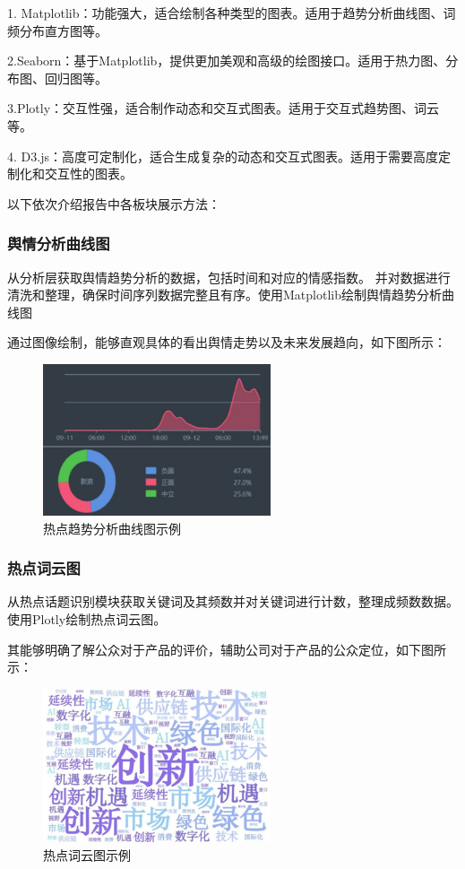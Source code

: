 \documentclass[UTF8,a4paper,15pt,titlepage,oneside]{ctexbook}
\begin{document}
1. Matplotlib：功能强大，适合绘制各种类型的图表。适用于趋势分析曲线图、词频分布直方图等。

2.Seaborn：基于Matplotlib，提供更加美观和高级的绘图接口。适用于热力图、分布图、回归图等。

3.Plotly：交互性强，适合制作动态和交互式图表。适用于交互式趋势图、词云等。

4. D3.js：高度可定制化，适合生成复杂的动态和交互式图表。适用于需要高度定制化和交互性的图表。


以下依次介绍报告中各板块展示方法：


\subsubsection{舆情分析曲线图}

从分析层获取舆情趋势分析的数据，包括时间和对应的情感指数。
并对数据进行清洗和整理，确保时间序列数据完整且有序。使用Matplotlib绘制舆情趋势分析曲线图

通过图像绘制，能够直观具体的看出舆情走势以及未来发展趋向，如下图所示：

\begin{figure}[H]
  \centering
  \includegraphics[width=0.6\textwidth,keepaspectratio=false]{pictures/4.png} %
  \caption{热点趋势分析曲线图示例}
\end{figure}

\subsubsection{热点词云图}

从热点话题识别模块获取关键词及其频数并对关键词进行计数，整理成频数数据。使用Plotly绘制热点词云图。

其能够明确了解公众对于产品的评价，辅助公司对于产品的公众定位，如下图所示：

\begin{figure}[H]
  \centering
  \includegraphics[width=0.6\textwidth,keepaspectratio=false]{pictures/5.png} %
  \caption{热点词云图示例}
\end{figure}
\end{document}

